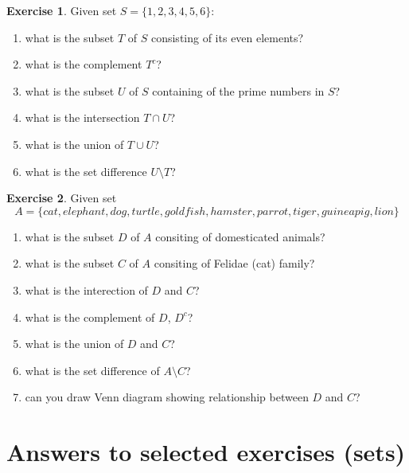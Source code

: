 \documentclass[
]{book}
\providecommand{\tightlist}{%
  \setlength{\itemsep}{0pt}\setlength{\parskip}{0pt}}
\theoremstyle{definition}
\theoremstyle{definition}
\theoremstyle{definition}
\newtheorem{exercise}{Exercise}[chapter]
\theoremstyle{remark}
\begin{document}
\begin{exercise}
\protect\hypertarget{exr:m-sets-01}{}{\label{exr:m-sets-01} }
Given set \(S = \{1, 2, 3, 4, 5, 6\}\):

\begin{enumerate}
\def\labelenumi{\alph{enumi})}
\tightlist
\item
  what is the subset \(T\) of \(S\) consisting of its even elements?
\item
  what is the complement \(T^c\)?
\item
  what is the subset \(U\) of \(S\) containing of the prime numbers in \(S\)?
\item
  what is the intersection \(T \cap U\)?
\item
  what is the union of \(T \cup U\)?
\item
  what is the set difference \(U \setminus T\)?
\end{enumerate}
\end{exercise}

\begin{exercise}
\protect\hypertarget{exr:m-sets-02}{}{\label{exr:m-sets-02} }
Given set \[A = \{cat, elephant, dog, turtle, goldfish, hamster, parrot, tiger, guinea pig, lion\}\]

\begin{enumerate}
\def\labelenumi{\alph{enumi})}
\tightlist
\item
  what is the subset \(D\) of \(A\) consiting of domesticated animals?
\item
  what is the subset \(C\) of \(A\) consiting of Felidae (cat) family?
\item
  what is the interection of \(D\) and \(C\)?
\item
  what is the complement of \(D\), \(D^c\)?
\item
  what is the union of \(D\) and \(C\)?
\item
  what is the set difference of \(A \setminus C\)?
\item
  can you draw Venn diagram showing relationship between \(D\) and \(C\)?
\end{enumerate}
\end{exercise}

\hypertarget{answers-to-selected-exercises-sets}{%
\section*{Answers to selected exercises (sets)}\label{answers-to-selected-exercises-sets}}
\end{document}

